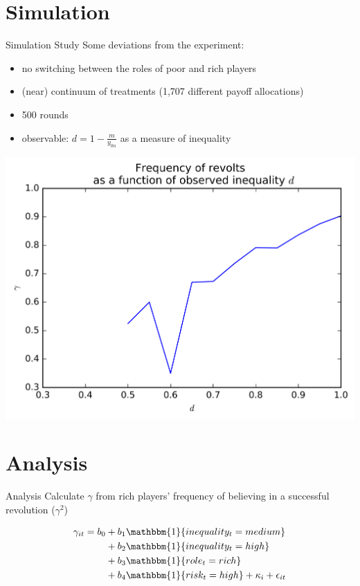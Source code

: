 \documentclass[mathserif]{beamer}
\begin{document}
	\section{Simulation}
	\begin{frame}{Simulation Study}
		Some deviations from the experiment:
		\begin{itemize}[<+->]
			\item no switching between the roles of poor and rich players
			\item (near) continuum of treatments (1,707 different payoff allocations)
			\item 500 rounds
			\item observable: $d=1-\frac{m}{y_{0n}}$ as a measure of inequality
		\end{itemize}
	\end{frame}
	
	\begin{frame}
		\includegraphics[height=\textheight]{../graph.png}
	\end{frame}
	
	\section{Analysis}
	\begin{frame}{Analysis}
		Calculate $\gamma$ from rich players' frequency of believing in a successful revolution ($\gamma^2$)
		
		\pause
		\begin{align*}
			\gamma_{it} = b_0 &+ b_1\mathbbm{1}\{inequality_t=medium\}\\
			&+ b_2\mathbbm{1}\{inequality_t=high\}\\
			&+ b_3\mathbbm{1}\{role_t=rich\}\\
			&+ b_4\mathbbm{1}\{risk_t=high\} + \kappa_i + \epsilon_{it}
		\end{align*}
	\end{frame}
	
\end{document}
